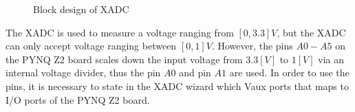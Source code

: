 \documentclass[../report.tex]{subfiles}
\begin{document}
\begin{figure}[H]
    \centering    
    \noindent{}
    \caption{Block design of XADC}
    \label{fig:block_xadc}
\end{figure}

The XADC is used to measure a voltage ranging from $[0, 3.3] V$, but the XADC can only accept voltage ranging between $[0, 1] V$. However, the pins $A0-A5$ on the PYNQ Z2 board scales down the input voltage from $3.3[V]$ to $1[V]$ via an internal voltage divider\cite{xadc_ref}, thus the pin $A0$ and pin $A1$ are used. In order to use the pins, it is necessary to state in the XADC wizard which Vaux ports that maps to I/O ports of the PYNQ Z2 board.  
\end{document}

